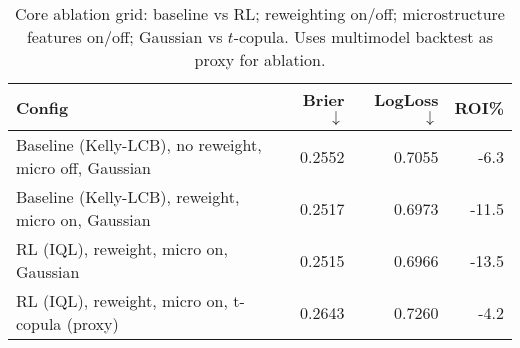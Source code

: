 \begin{table}[t]
  \centering
  \small
  \caption[Core ablation grid (mock)]{Core ablation grid: baseline vs RL; reweighting on/off; microstructure features on/off; Gaussian vs $t$-copula. Uses multimodel backtest as proxy for ablation.}
  \label{tab:core-ablation}
  \setlength{\tabcolsep}{3pt}\renewcommand{\arraystretch}{1.12}
  \begin{tabular}{@{} l r r r @{} }
    \toprule
    \textbf{Config}  & \textbf{Brier $\downarrow$}  & \textbf{LogLoss $\downarrow$}  & \textbf{ROI\%} \\
    \midrule
    Baseline (Kelly-LCB), no reweight, micro off, Gaussian & 0.2552 & 0.7055 & -6.3 \\
    Baseline (Kelly-LCB), reweight, micro on, Gaussian & 0.2517 & 0.6973 & -11.5 \\
    RL (IQL), reweight, micro on, Gaussian & 0.2515 & 0.6966 & -13.5 \\
    RL (IQL), reweight, micro on, t-copula (proxy) & 0.2643 & 0.7260 & -4.2 \\
    \bottomrule
  \end{tabular}
\end{table}
